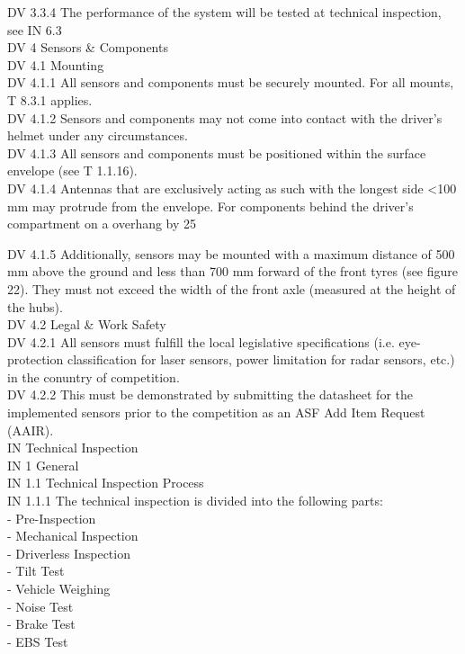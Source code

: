 \documentclass{article}
\begin{document}
DV 3.3.4 The performance of the system will be tested at technical inspection, see IN 6.3\\

DV 4 Sensors & Components\\

DV 4.1 Mounting\\

DV 4.1.1 All sensors and components must be securely mounted. For all mounts, T 8.3.1 applies.\\

DV 4.1.2 Sensors and components may not come into contact with the driver's helmet under any circumstances.\\

DV 4.1.3 All sensors and components must be positioned within the surface envelope (see T 1.1.16).\\

DV 4.1.4 Antennas that are exclusively acting as such with the longest side <100 mm may protrude from the envelope. For components behind the driver's compartment on a overhang by 25 %

DV 4.1.5 Additionally, sensors may be mounted with a maximum distance of 500 mm above the ground and less than 700 mm forward of the front tyres (see figure 22). They must not exceed the width of the front axle (measured at the height of the hubs).\\

DV 4.2 Legal & Work Safety\\

DV 4.2.1 All sensors must fulfill the local legislative specifications (i.e. eye-protection classification for laser sensors, power limitation for radar sensors, etc.) in the conuntry of competition.\\

DV 4.2.2 This must be demonstrated by submitting the datasheet for the implemented sensors prior to the competition as an ASF Add Item Request (AAIR).\\

IN Technical Inspection\\

IN 1 General\\

IN 1.1 Technical Inspection Process\\

IN 1.1.1 The technical inspection is divided into the following parts:\\
	- Pre-Inspection\\
	- Mechanical Inspection\\
	- Driverless Inspection\\
	- Tilt Test\\
	- Vehicle Weighing\\
	- Noise Test\\
	- Brake Test\\
	- EBS Test\\
\end{document}
